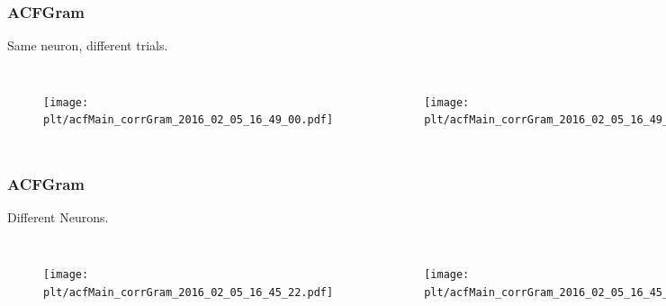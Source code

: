 \documentclass{beamer}
\newcommand{\plt}{../../plots}
\begin{document}
\begin{frame}
\frametitle{ACFGram}
Same neuron, different trials.
\begin{columns}[c]

\begin{figure}
\texttt{[image: \\plt/acfMain\_corrGram\_2016\_02\_05\_16\_49\_00.pdf]}
\end{figure}

\begin{figure}
\texttt{[image: \\plt/acfMain\_corrGram\_2016\_02\_05\_16\_49\_10.pdf]}
\end{figure}
\end{columns}
\end{frame}


\begin{frame}
\frametitle{ACFGram}
Different Neurons.
\begin{columns}[c]

\begin{figure}
\texttt{[image: \\plt/acfMain\_corrGram\_2016\_02\_05\_16\_45\_22.pdf]}
\end{figure}

\begin{figure}
\texttt{[image: \\plt/acfMain\_corrGram\_2016\_02\_05\_16\_45\_38.pdf]}
\end{figure}
\end{columns}
\end{frame}
\end{document}
